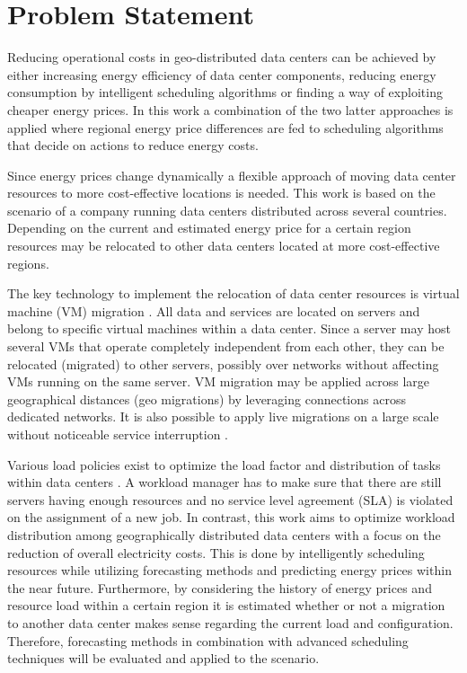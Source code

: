 \section{Problem Statement}

Reducing operational costs in geo-distributed data centers can be achieved by either increasing energy efficiency of data center components, reducing energy consumption by intelligent scheduling algorithms or finding a way of exploiting cheaper energy prices. In this work a combination of the two latter approaches is applied where regional energy price differences are fed to scheduling algorithms that decide on actions to reduce energy costs. 

Since energy prices change dynamically a flexible approach of moving data center resources to more cost-effective locations is needed. This work is based on the scenario of a company running data centers distributed across several countries. Depending on the current and estimated energy price for a certain region resources may be relocated to other data centers located at more cost-effective regions.

The key technology to implement the relocation of data center resources is virtual machine (VM) migration \cite{nelson2009virtual}. All data and services are located on servers and belong to specific virtual machines within a data center. Since a server may host several VMs that operate completely independent from each other, they can be relocated (migrated) to other servers, possibly over networks without affecting VMs running on the same server. VM migration may be applied across large geographical distances (geo migrations) by leveraging connections across dedicated networks. It is also possible to apply live migrations on a large scale without noticeable service interruption \cite{celesti2010improving}\cite{liu2013performance}\cite{akoush2010predicting}. 

Various load policies exist to optimize the load factor and distribution of tasks within data centers \cite{buyya2010energy,mishra2012dynamic,xiao2013dynamic,pawar2012priority}. A workload manager has to make sure that there are still servers having enough resources and no service level agreement (SLA) is violated on the assignment of a new job. 
In contrast, this work aims to optimize workload distribution among geographically distributed data centers with a focus on the reduction of overall electricity costs. This is done by intelligently scheduling resources while utilizing forecasting methods and predicting energy prices within the near future. 
Furthermore, by considering the history of energy prices and resource load within a certain region it is estimated whether or not a migration to another data center makes sense regarding the current load and configuration. Therefore, forecasting methods in combination with advanced scheduling techniques will be evaluated and applied to the scenario. 

